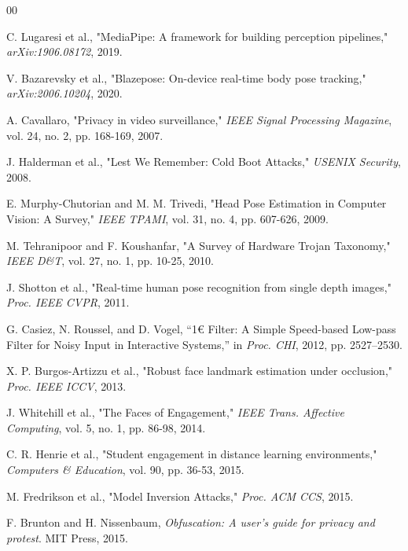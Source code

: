 \documentclass[conference]{IEEEtran}
\begin{document}
\begin{thebibliography}{00}

 C. Lugaresi et al., "MediaPipe: A framework for building perception pipelines," \textit{arXiv:1906.08172}, 2019.

 V. Bazarevsky et al., "Blazepose: On-device real-time body pose tracking," \textit{arXiv:2006.10204}, 2020.

 A. Cavallaro, "Privacy in video surveillance," \textit{IEEE Signal Processing Magazine}, vol. 24, no. 2, pp. 168-169, 2007.

 J. Halderman et al., "Lest We Remember: Cold Boot Attacks," \textit{USENIX Security}, 2008.

 E. Murphy-Chutorian and M. M. Trivedi, "Head Pose Estimation in Computer Vision: A Survey," \textit{IEEE TPAMI}, vol. 31, no. 4, pp. 607-626, 2009.

 M. Tehranipoor and F. Koushanfar, "A Survey of Hardware Trojan Taxonomy," \textit{IEEE D\&T}, vol. 27, no. 1, pp. 10-25, 2010.

 J. Shotton et al., "Real-time human pose recognition from single depth images," \textit{Proc. IEEE CVPR}, 2011.

 G. Casiez, N. Roussel, and D. Vogel, ``1€ Filter: A Simple Speed-based Low-pass Filter for Noisy Input in Interactive Systems,'' in \textit{Proc. CHI}, 2012, pp. 2527--2530.

 X. P. Burgos-Artizzu et al., "Robust face landmark estimation under occlusion," \textit{Proc. IEEE ICCV}, 2013.


 J. Whitehill et al., "The Faces of Engagement," \textit{IEEE Trans. Affective Computing}, vol. 5, no. 1, pp. 86-98, 2014.

 C. R. Henrie et al., "Student engagement in distance learning environments," \textit{Computers \& Education}, vol. 90, pp. 36-53, 2015.


 M. Fredrikson et al., "Model Inversion Attacks," \textit{Proc. ACM CCS}, 2015.


 F. Brunton and H. Nissenbaum, \textit{Obfuscation: A user's guide for privacy and protest}. MIT Press, 2015.


\end{thebibliography}
\end{document}
